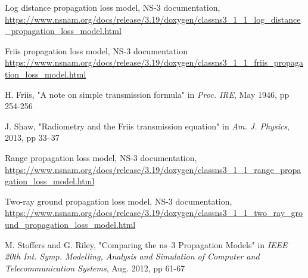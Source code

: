 \documentclass[11pt,journal]{article}
\begin{document}
	\begin{thebibliography}{1}
		Log distance propagation loss model, NS-3 documentation, \url{https://www.nsnam.org/docs/release/3.19/doxygen/classns3_1_1_log_distance_propagation_loss_model.html}
		
		Friis propagation loss model, NS-3 documentation
		\url{https://www.nsnam.org/docs/release/3.19/doxygen/classns3_1_1_friis_propagation_loss_model.html}
		
		H. Friis, "A note on simple transmission formula" in \emph{Proc. IRE}, May 1946, pp 254-256
		
		J. Shaw, "Radiometry and the Friis transmission equation" in \emph{Am. J. Physics}, 2013, pp 33–37
		
		Range propagation loss model, NS-3 documentation, \url{https://www.nsnam.org/docs/release/3.19/doxygen/classns3_1_1_range_propagation_loss_model.html}
		
		Two-ray ground propagation loss model, NS-3 documentation, \url{https://www.nsnam.org/docs/release/3.19/doxygen/classns3_1_1_two_ray_ground_propagation_loss_model.html}
		
		M. Stoffers and G. Riley, "Comparing the ns–3 Propagation Models" in \emph{IEEE 20th Int. Symp. Modelling, Analysis and Simulation of Computer and Telecommunication Systems}, Aug. 2012, pp 61-67
		
	\end{thebibliography}
	
	
	

	
\end{document}

